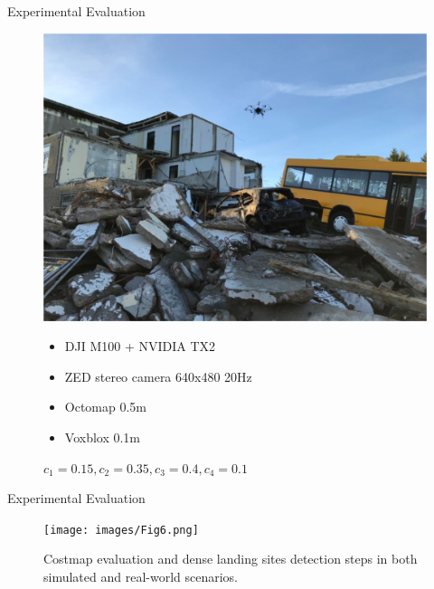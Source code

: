 \documentclass[10pt]{beamer}
\begin{document}
\begin{frame}{Experimental Evaluation}
\begin{figure}
\begin{minipage}{0.475\linewidth}
                \includegraphics[width=\textwidth]{images/Fig5b.png}
                \vspace{-0.25cm}
                {
                    \scriptsize
                    \begin{itemize}
                        \item DJI M100 + NVIDIA TX2
                        \item ZED stereo camera 640x480 20Hz
                        \item Octomap 0.5m
                        \item Voxblox 0.1m
                    \end{itemize}
                    \vspace{-0.15cm}
                    $c_1=0.15, c_2=0.35, c_3=0.4, c_4=0.1$
                }
            \end{minipage}
        \end{figure}
    \end{frame}

    \begin{frame}{Experimental Evaluation}
        \begin{figure}
            \caption{
                \justifying
                Costmap evaluation and dense landing sites detection steps
                in both simulated and real-world scenarios.}
            \vspace{-0.3cm}
            \texttt{[image: images/Fig6.png]}
        \end{figure}
    \end{frame}
\end{document}
